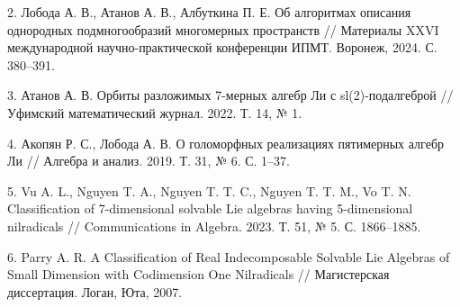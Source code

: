 \documentclass[12pt]{article}
\begin{document}
2. Лобода А. В., Атанов А. В., Албуткина П. Е. Об алгоритмах описания однородных подмногообразий многомерных пространств // Материалы XXVI международной научно-практической конференции ИПМТ. Воронеж, 2024. С. 380–391.

3. Атанов А. В. Орбиты разложимых 7-мерных алгебр Ли с sl(2)-подалгеброй // Уфимский математический журнал. 2022. Т. 14, № 1.

4. Акопян Р. С., Лобода А. В. О голоморфных реализациях пятимерных алгебр Ли // Алгебра и анализ. 2019. Т. 31, № 6. С. 1–37. 

5. Vu A. L., Nguyen T. A., Nguyen T. T. C., Nguyen T. T. M., Vo T. N. Classification of 7-dimensional solvable Lie algebras having 5-dimensional nilradicals // Communications in Algebra. 2023. Т. 51, № 5. С. 1866–1885.

6. Parry A. R. A Classification of Real Indecomposable Solvable Lie Algebras of Small Dimension with Codimension One Nilradicals // Магистерская диссертация. Логан, Юта, 2007.
\end{document}
